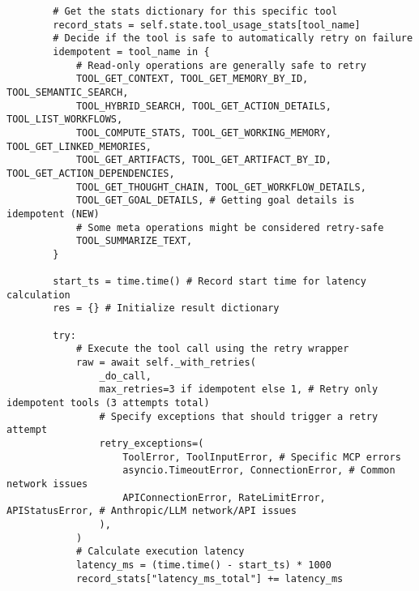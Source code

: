 \documentclass[12pt,a4paper]{article}
\begin{document}
\begin{pageablecode}
\begin{verbatim}
        # Get the stats dictionary for this specific tool
        record_stats = self.state.tool_usage_stats[tool_name]
        # Decide if the tool is safe to automatically retry on failure
        idempotent = tool_name in {
            # Read-only operations are generally safe to retry
            TOOL_GET_CONTEXT, TOOL_GET_MEMORY_BY_ID, TOOL_SEMANTIC_SEARCH,
            TOOL_HYBRID_SEARCH, TOOL_GET_ACTION_DETAILS, TOOL_LIST_WORKFLOWS,
            TOOL_COMPUTE_STATS, TOOL_GET_WORKING_MEMORY, TOOL_GET_LINKED_MEMORIES,
            TOOL_GET_ARTIFACTS, TOOL_GET_ARTIFACT_BY_ID, TOOL_GET_ACTION_DEPENDENCIES,
            TOOL_GET_THOUGHT_CHAIN, TOOL_GET_WORKFLOW_DETAILS,
            TOOL_GET_GOAL_DETAILS, # Getting goal details is idempotent (NEW)
            # Some meta operations might be considered retry-safe
            TOOL_SUMMARIZE_TEXT,
        }

        start_ts = time.time() # Record start time for latency calculation
        res = {} # Initialize result dictionary

        try:
            # Execute the tool call using the retry wrapper
            raw = await self._with_retries(
                _do_call,
                max_retries=3 if idempotent else 1, # Retry only idempotent tools (3 attempts total)
                # Specify exceptions that should trigger a retry attempt
                retry_exceptions=(
                    ToolError, ToolInputError, # Specific MCP errors
                    asyncio.TimeoutError, ConnectionError, # Common network issues
                    APIConnectionError, RateLimitError, APIStatusError, # Anthropic/LLM network/API issues
                ),
            )
            # Calculate execution latency
            latency_ms = (time.time() - start_ts) * 1000
            record_stats["latency_ms_total"] += latency_ms


\end{verbatim}
\end{pageablecode}
\end{document}
